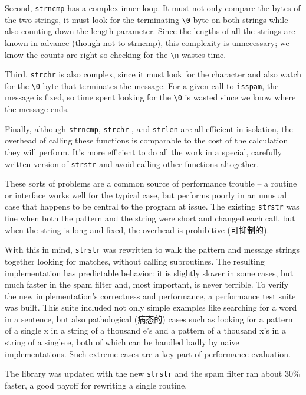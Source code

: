 Second, \verb'strncmp' has a complex inner loop. It must not only compare
the bytes of the two strings, it must look for the terminating \verb'\0'
byte on both strings while also counting down the length parameter. Since
the lengths of all the strings are known in advance (though not to
strncmp), this complexity is unnecessary; we know the counts are right so
checking for the \verb'\n' wastes time.

Third, \verb'strchr' is also complex, since it must look for the character
and also watch for the \verb'\0' byte that terminates the message. For a
given call to \verb'isspam', the message is fixed, so time spent looking
for the \verb'\0' is wasted since we know where the message ends.

Finally, although \verb'strncmp', \verb'strchr' , and \verb'strlen' are all
efficient in isolation, the overhead of calling these functions is
comparable to the cost of the calculation they will perform. It's more
efficient to do all the work in a special, carefully written version of
\verb'strstr' and avoid calling other functions altogether.

These sorts of problems are a common source of performance trouble -- a
routine or interface works well for the typical case, but performs poorly
in an unusual case that happens to be central to the program at issue. The
existing \verb'strstr' was fine when both the pattern and the string were
short and changed each call, but when the string is long and fixed, the
overhead is prohibitive (可抑制的).

With this in mind, \verb'strstr' was rewritten to walk the pattern and
message strings together looking for matches, without calling subroutines.
The resulting implementation has predictable behavior: it is slightly
slower in some cases, but much faster in the spam filter and, most
important, is never terrible. To verify the new implementation's
correctness and performance, a performance test suite was built.  This
suite included not only simple examples like searching for a word in a
sentence, but also pathological (病态的) cases such as looking for a
pattern of a single x in a string of a thousand e's and a pattern of a
thousand x's in a string of a single e, both of which can be handled badly
by naive implementations. Such extreme cases are a key part of performance
evaluation.

The library was updated with the new \verb'strstr' and the spam filter ran
about $30\%$ faster, a good payoff for rewriting a single routine.

